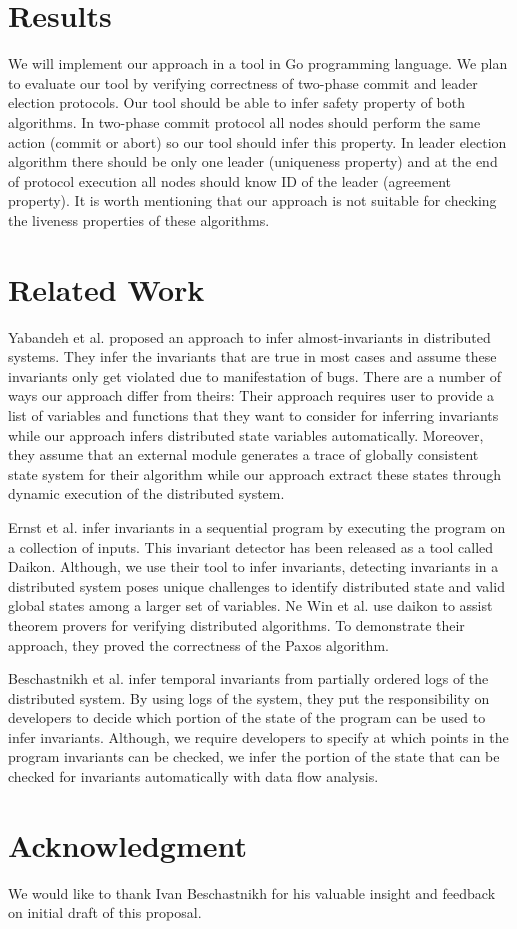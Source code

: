 \section{Results}
We will implement our approach in a tool in Go programming language. We plan to evaluate our tool by verifying correctness of two-phase commit and leader election protocols. Our tool should be able to infer safety property of both algorithms. In two-phase commit protocol all nodes should perform the same action (commit or abort) so our tool should infer this property. In leader election algorithm there should be only one leader (uniqueness property) and at the end of protocol execution all nodes should know ID of the leader (agreement property). It is worth mentioning that our approach is not suitable for checking the liveness properties of these algorithms.

\section{Related Work}

Yabandeh et al.\cite{yabandeh2011finding} proposed an approach to
infer almost-invariants in distributed systems. They infer the
invariants that are true in most cases and assume these invariants
only get violated due to manifestation of bugs. There are a number of
ways our approach differ from theirs: Their approach requires user to
provide a list of variables and functions that they want to consider
for inferring invariants while our approach infers distributed state
variables automatically. Moreover, they assume that an external module
generates a trace of globally consistent state system for their
algorithm while our approach extract these states through dynamic
execution of the distributed system.

Ernst et al.\cite{ernst2001dynamically} infer invariants in a
sequential program by executing the program on a collection of inputs.
This invariant detector has been released as a tool called
Daikon\cite{ernst2007daikon}. Although, we use their tool to infer
invariants, detecting invariants in a distributed system poses unique
challenges to identify distributed state and valid global states among
a larger set of variables. Ne Win et al.\cite{NeWinEGKL04} use daikon
to assist theorem provers for verifying distributed algorithms. To
demonstrate their approach, they proved the correctness of the Paxos
algorithm.

Beschastnikh et al. \cite{temporalInv} infer temporal invariants from partially ordered logs of the distributed system. By using logs of the system, they put the responsibility on developers to decide which portion of the state of the program can be used to infer invariants. Although, we require developers to specify at which points in the program invariants can be checked, we infer the portion of the state that can be checked for invariants automatically with data flow analysis.


\section{Acknowledgment}
We would like to thank Ivan Beschastnikh for his valuable insight and feedback on initial draft of this proposal.